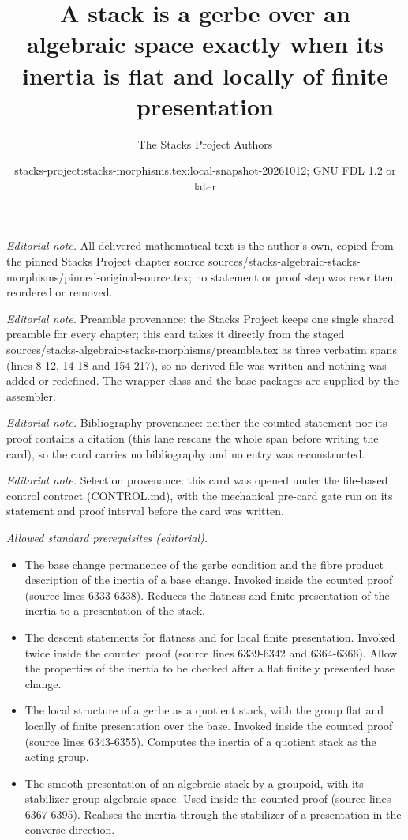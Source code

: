 \documentclass[10pt,a4paper]{amsart}
\title{A stack is a gerbe over an algebraic space exactly when its inertia is flat and locally of finite presentation}
\author{The Stacks Project Authors}
\date{stacks-project:stacks-morphisms.tex:local-snapshot-20261012; GNU FDL 1.2 or later}
\theoremstyle{plain}
\theoremstyle{definition}
\theoremstyle{remark}
\numberwithin{equation}{subsection}
\begin{document}
\maketitle
\noindent\textit{Editorial note.} All delivered mathematical text is the author's own, copied from the pinned Stacks Project chapter source sources/stacks-algebraic-stacks-morphisms/pinned-original-source.tex; no statement or proof step was rewritten, reordered or removed.\par\medskip
\noindent\textit{Editorial note.} Preamble provenance: the Stacks Project keeps one single shared preamble for every chapter; this card takes it directly from the staged sources/stacks-algebraic-stacks-morphisms/preamble.tex as three verbatim spans (lines 8-12, 14-18 and 154-217), so no derived file was written and nothing was added or redefined. The wrapper class and the base packages are supplied by the assembler.\par\medskip
\noindent\textit{Editorial note.} Bibliography provenance: neither the counted statement nor its proof contains a citation (this lane rescans the whole span before writing the card), so the card carries no bibliography and no entry was reconstructed.\par\medskip
\noindent\textit{Editorial note.} Selection provenance: this card was opened under the file-based control contract (CONTROL.md), with the mechanical pre-card gate run on its statement and proof interval before the card was written.\par\medskip
\noindent\textit{Allowed standard prerequisites (editorial).}\begin{itemize}
\item The base change permanence of the gerbe condition and the fibre product description of the inertia of a base change. Invoked inside the counted proof (source lines 6333-6338). Reduces the flatness and finite presentation of the inertia to a presentation of the stack.
\item The descent statements for flatness and for local finite presentation. Invoked twice inside the counted proof (source lines 6339-6342 and 6364-6366). Allow the properties of the inertia to be checked after a flat finitely presented base change.
\item The local structure of a gerbe as a quotient stack, with the group flat and locally of finite presentation over the base. Invoked inside the counted proof (source lines 6343-6355). Computes the inertia of a quotient stack as the acting group.
\item The smooth presentation of an algebraic stack by a groupoid, with its stabilizer group algebraic space. Used inside the counted proof (source lines 6367-6395). Realises the inertia through the stabilizer of a presentation in the converse direction.
\end{itemize}\medskip
\end{document}
